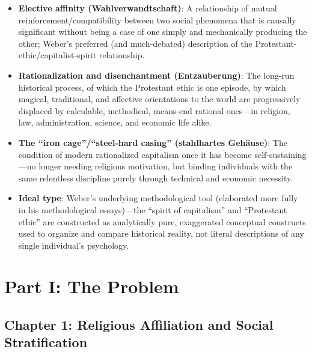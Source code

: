 \documentclass[12pt]{article}
\begin{document}
\begin{itemize}[leftmargin=*, itemsep=4pt]
    \item \textbf{Elective affinity (Wahlverwandtschaft)}: A relationship of mutual reinforcement/compatibility between two social phenomena that is causally significant without being a case of one simply and mechanically producing the other; Weber's preferred (and much-debated) description of the Protestant-ethic/capitalist-spirit relationship.
    \item \textbf{Rationalization and disenchantment (Entzauberung)}: The long-run historical process, of which the Protestant ethic is one episode, by which magical, traditional, and affective orientations to the world are progressively displaced by calculable, methodical, means-end rational ones---in religion, law, administration, science, and economic life alike.
    \item \textbf{The ``iron cage''/``steel-hard casing'' (stahlhartes Geh\"ause)}: The condition of modern rationalized capitalism once it has become self-sustaining---no longer needing religious motivation, but binding individuals with the same relentless discipline purely through technical and economic necessity.
    \item \textbf{Ideal type}: Weber's underlying methodological tool (elaborated more fully in his methodological essays)---the ``spirit of capitalism'' and ``Protestant ethic'' are constructed as analytically pure, exaggerated conceptual constructs used to organize and compare historical reality, not literal descriptions of any single individual's psychology.
\end{itemize}

\section{Part I: The Problem}

\subsection*{Chapter 1: Religious Affiliation and Social Stratification}
\end{document}
